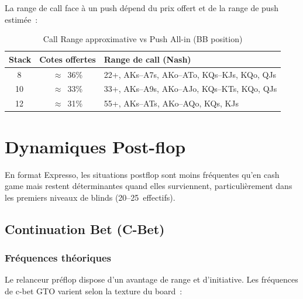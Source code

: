 \documentclass[a4paper,11pt]{article}
\newcommand{\bb}{\,\mathrm{bb}}
\begin{document}
La range de call face \`a un push d\'epend du prix offert et de la range de push estim\'ee~:

\begin{table}[H]
\centering
\caption{Call Range approximative vs Push All-in (BB position)}
\label{tab:call_vs_push}
\small
\begin{tabular}{c c l}
\toprule
\textbf{Stack} & \textbf{Cotes offertes} & \textbf{Range de call (Nash)} \\
\midrule
8\bb & $\approx$~36\% & 22+, AKs--A7s, AKo--ATo, KQs--KJs, KQo, QJs \\
10\bb & $\approx$~33\% & 33+, AKs--A9s, AKo--AJo, KQs--KTs, KQo, QJs \\
12\bb & $\approx$~31\% & 55+, AKs--ATs, AKo--AQo, KQs, KJs \\
\bottomrule
\end{tabular}
\end{table}


\newpage
\section{Dynamiques Post-flop}

En format Expresso, les situations postflop sont moins fr\'equentes qu'en cash game mais restent d\'eterminantes quand elles surviennent, particuli\`erement dans les premiers niveaux de blinds (20--25\bb{} effectifs).

\subsection{Continuation Bet (C-Bet)}

\subsubsection{Fr\'equences th\'eoriques}

Le relanceur pr\'eflop dispose d'un avantage de range et d'initiative. Les fr\'equences de c-bet GTO varient selon la texture du board~:
\end{document}

